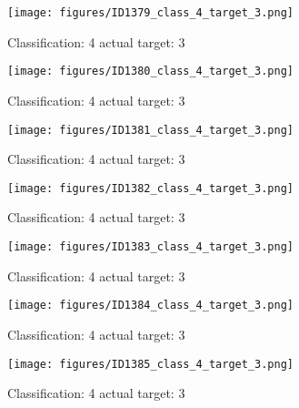 \begin{figure}[h!]
\begin{center}
\texttt{[image: figures/ID1379\_class\_4\_target\_3.png]}
\end{center}
\caption{ Classification: 4 actual target: 3}
\label{fig:ID1379_class_4_target_3}
\end{figure}
\begin{figure}[h!]
\begin{center}
\texttt{[image: figures/ID1380\_class\_4\_target\_3.png]}
\end{center}
\caption{ Classification: 4 actual target: 3}
\label{fig:ID1380_class_4_target_3}
\end{figure}
\begin{figure}[h!]
\begin{center}
\texttt{[image: figures/ID1381\_class\_4\_target\_3.png]}
\end{center}
\caption{ Classification: 4 actual target: 3}
\label{fig:ID1381_class_4_target_3}
\end{figure}
\begin{figure}[h!]
\begin{center}
\texttt{[image: figures/ID1382\_class\_4\_target\_3.png]}
\end{center}
\caption{ Classification: 4 actual target: 3}
\label{fig:ID1382_class_4_target_3}
\end{figure}
\begin{figure}[h!]
\begin{center}
\texttt{[image: figures/ID1383\_class\_4\_target\_3.png]}
\end{center}
\caption{ Classification: 4 actual target: 3}
\label{fig:ID1383_class_4_target_3}
\end{figure}
\begin{figure}[h!]
\begin{center}
\texttt{[image: figures/ID1384\_class\_4\_target\_3.png]}
\end{center}
\caption{ Classification: 4 actual target: 3}
\label{fig:ID1384_class_4_target_3}
\end{figure}
\begin{figure}[h!]
\begin{center}
\texttt{[image: figures/ID1385\_class\_4\_target\_3.png]}
\end{center}
\caption{ Classification: 4 actual target: 3}
\label{fig:ID1385_class_4_target_3}
\end{figure}
